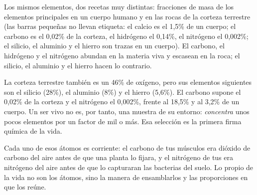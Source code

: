 \begin{omfigure}

{\small Los mismos elementos, dos recetas muy distintas: fracciones de
masa de los elementos principales en un cuerpo humano y en las rocas de
la corteza terrestre (las barras pequeñas no llevan etiqueta: el calcio
es el 1,5\% de un cuerpo; el carbono es el 0,02\% de la corteza, el
hidrógeno el 0,14\%, el nitrógeno el 0,002\%; el silicio, el aluminio y
el hierro son trazas en un cuerpo). El carbono, el hidrógeno y el
nitrógeno abundan en la materia viva y escasean en la roca; el silicio,
el aluminio y el hierro hacen lo contrario.}
\end{omfigure}

\begin{example}\label{ex:g10:chemistry-of-life:crust}
La corteza terrestre también es un 46\% de oxígeno, pero sus elementos
siguientes son el silicio (28\%), el aluminio (8\%) y el hierro
(5,6\%). El carbono supone el 0,02\% de la corteza y el nitrógeno el
0,002\%, frente al 18,5\% y al 3,2\% de un cuerpo. Un ser vivo no es,
por tanto, una muestra de su entorno: \emph{concentra} unos pocos
elementos por un factor de mil o más. Esa selección es la primera
firma química de la vida.
\end{example}

\begin{remark}\label{rem:g10:chemistry-of-life:origin}
Cada uno de esos átomos es corriente: el carbono de tus músculos era
dióxido de carbono del aire antes de que una planta lo fijara, y el
nitrógeno de tus  era nitrógeno del aire antes de que lo
capturaran las bacterias del suelo. Lo propio de la vida no son los
átomos, sino la manera de ensamblarlos y las proporciones en que los
reúne.
\end{remark}

